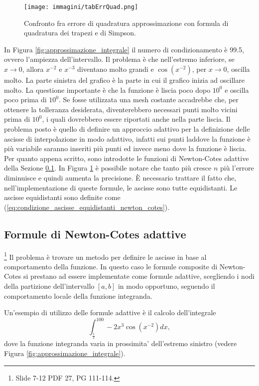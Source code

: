 \begin{figure}
    \centering
    \texttt{[image: immagini/tabErrQuad.png]}
    \caption{Confronto fra errore di quadratura approssimazione con formula di quadratura dei trapezi e di Simpson.}\label{fig:tabella_errore_quadratura}
\end{figure}

In Figura \ref{fig:approssimazione_integrale} il numero di condizionamento è 99.5, ovvero l'ampiezza dell'intervallo. Il problema è che nell'estremo inferiore, se $x\rightarrow 0$, allora $x^{-2}$ e $x^{-3}$ diventano molto grandi e $\cos{(x^{-2})}$, per $x\rightarrow 0$, oscilla molto. La parte sinistra del grafico è la parte in cui il grafico inizia ad oscillare molto. La questione importante è che la funzione è liscia poco dopo $10^0$ e oscilla poco prima di $10^0$. Se fosse utilizzata una mesh costante accadrebbe che, per ottenere la tolleranza desiderata, diventerebbero necessari punti molto vicini prima di $10^0$, i quali dovrebbero essere riportati anche nella parte liscia. Il problema posto è quello di definire un approccio adattivo per la definizione delle ascisse di interpolazione in modo adattivo, infatti sui punti laddove la funzione è più variabile saranno inseriti più punti ed invece meno dove la funzione è liscia. Per quanto appena scritto, sono introdotte le funzioni di Newton-Cotes adattive della Sezione \ref{ssec:formule_newton-cotes_adattive}.
In Figura \ref{fig:tabella_errore_quadratura} è possibile notare che tanto più cresce $n$ più l'errore diminuisce e quindi aumenta la precisione. È necessario trattare il fatto che, nell'implementazione di queste formule, le ascisse sono tutte equidistanti. Le ascisse equidistanti sono definite come (\ref{eq:condizione_ascisse_equidistanti_newton_cotes}).

\subsection{Formule di Newton-Cotes adattive}\label{ssec:formule_newton-cotes_adattive}
\footnote{Slide 7-12 PDF 27, PG 111-114.}
Il problema è trovare un metodo per definire le ascisse in base al comportamento della funzione. In questo caso le formule composite di Newton-Cotes si prestano ad essere implementate come formule adattive, scegliendo i nodi della partizione dell'intervallo $[a,b]$ in modo opportuno, seguendo il comportamento locale della funzione integranda.

Un'esempio di utilizzo delle formule adattive è il calcolo dell'integrale
\begin{equation}\label{eq:integrale_esempio_formule_newton_cotes_adattive}
	\int_{\frac{1}{2}}^{100}-2x^3\cos(x^{-2}) dx,
\end{equation}
dove la funzione integranda varia in prossimita' dell'estremo sinistro (vedere Figura \ref{fig:approssimazione_integrale}).

